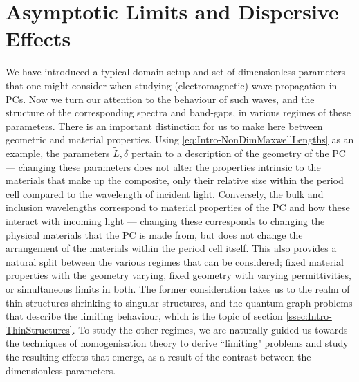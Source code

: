 \section{Asymptotic Limits and Dispersive Effects} \label{sec:AsymptoticStudies}
We have introduced a typical domain setup and set of dimensionless parameters that one might consider when studying (electromagnetic) wave propagation in PCs.
Now we turn our attention to the behaviour of such waves, and the structure of the corresponding spectra and band-gaps, in various regimes of these parameters.
There is an important distinction for us to make here between geometric and material properties.
Using \eqref{eq:Intro-NonDimMaxwellLengths} as an example, the parameters $\tilde{L}, \delta$ pertain to a description of the geometry of the PC --- changing these parameters does not alter the properties intrinsic to the materials that make up the composite, only their relative size within the period cell compared to the wavelength of incident light.
Conversely, the bulk and inclusion wavelengths correspond to material properties of the PC and how these interact with incoming light --- changing these corresponds to changing the physical materials that the PC is made from, but does not change the arrangement of the materials within the period cell itself.
This also provides a natural split between the various regimes that can be considered; fixed material properties with the geometry varying, fixed geometry with varying permittivities, or simultaneous limits in both.
The former consideration takes us to the realm of thin structures shrinking to singular structures, and the quantum graph problems that describe the limiting behaviour, which is the topic of section \ref{ssec:Intro-ThinStructures}.
To study the other regimes, we are naturally guided us towards the techniques of homogenisation theory to derive ``limiting" problems and study the resulting effects that emerge, as a result of the contrast between the dimensionless parameters.





